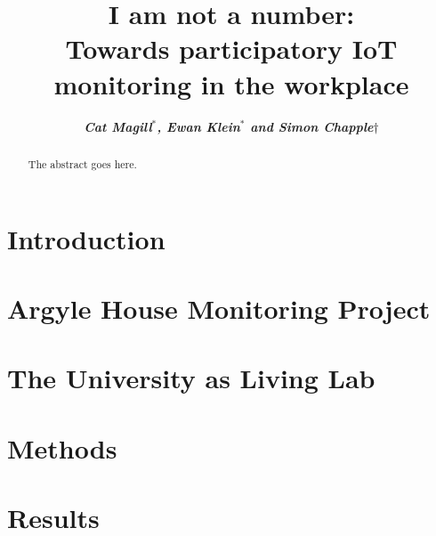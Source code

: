 \documentclass[10pt,twocolumn]{article}
\begin{document}
\title{I am not a number:\\
Towards participatory IoT monitoring in the workplace}



\author{\textbf{\textit{Cat Magill$^*$, Ewan Klein$^*$ and Simon Chapple$\dagger$}}}
\date{}

\maketitle


\begin{abstract}
The abstract goes here.
\end{abstract}



\section{Introduction}
\label{sec:introduction}



\section{Argyle House Monitoring Project}
\label{sec:argyle-house}



\section{The University as Living Lab}
\label{sec:university-as-ll}



\section{Methods}
\label{sec:methods}




\section{Results}
\label{sec:results}
\end{document}

